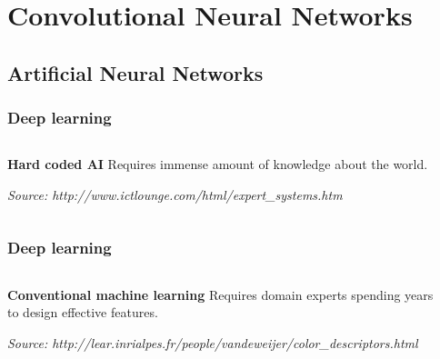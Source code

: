 \section{Convolutional Neural Networks}

\subsection{Artificial Neural Networks}

\begin{frame}[t]
\frametitle{Deep learning}
\vspace{-1cm}
\begin{columns}[T]
\begin{column}{0.4\textwidth}
\vspace{1cm}
\begin{block}{\bf Hard coded AI}
Requires immense amount of knowledge about the world.
\end{block}
{\tiny\em Source: http://www.ictlounge.com/html/expert\_systems.htm}
\end{column}\hfill

\begin{column}{0.6\textwidth}
\end{column}
\end{columns}

\end{frame}

\begin{frame}[t]
\frametitle{Deep learning}
\vspace{-1cm}
\begin{columns}[T]
\begin{column}{0.4\textwidth}
\vspace{1cm}
\begin{block}{\bf Conventional machine learning}
Requires domain experts spending years to design effective features.
\end{block}
{\tiny\em Source: http://lear.inrialpes.fr/people/vandeweijer/color\_descriptors.html}
\end{column}\hfill

\begin{column}{0.6\textwidth}
\end{column}
\end{columns}

\end{frame}


